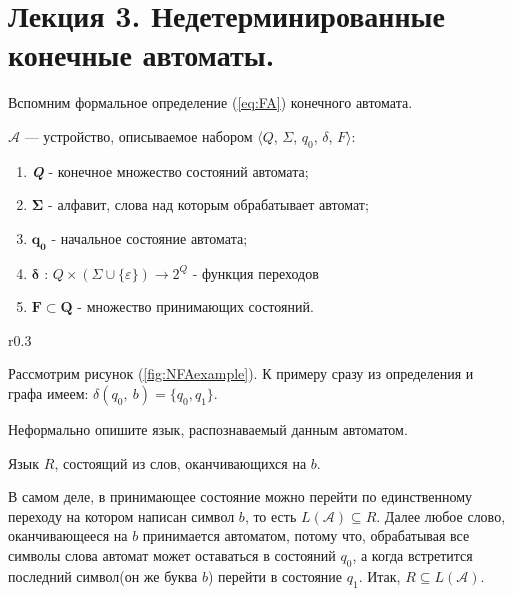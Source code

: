 \section{Лекция 3. Недетерминированные конечные автоматы.}

Вспомним формальное определение (\ref{eq:FA}) конечного автомата.

\textbf{} $\mathcal{A}$ --- устройство, описываемое набором $\langle Q$, $\Sigma$, $q_0$, $\delta$, $F \rangle$:
\begin{enumerate}
  \item {\bfseries\itshape{Q}} - конечное множество состояний автомата;
  \item $\boldsymbol{\Sigma}$ - алфавит, слова над которым обрабатывает автомат;
  \item $\boldsymbol{q_0}$ - начальное состояние автомата;
  \item $\boldsymbol{\delta}$ : $Q \times (\Sigma\cup\{\varepsilon\} ) \rightarrow 2^{Q}$ - функция переходов
  \item $\boldsymbol{F} \subset \boldsymbol{Q}$ - множество принимающих состояний.
\end{enumerate}


\begin{wrapfigure}{r}{0.3\textwidth}
  \centering
  \caption{Пример НДА.}
  \label{fig:NFAexample}
\end{wrapfigure}

Рассмотрим рисунок (\ref{fig:NFAexample}). К примеру сразу из определения и графа имеем: $\delta(q_0,\:b)=\{q_0,q_1\}$.

\begin{question}
  Неформально опишите язык, распознаваемый данным автоматом.
\end{question}

\begin{nonum}
  Язык $R$, состоящий из слов, оканчивающихся на $b$.

  В самом деле, в принимающее состояние можно перейти по единственному переходу на котором написан символ $b$, то есть $L(\mathcal{A})\subseteq R$.
  Далее любое слово, оканчивающееся на $b$ принимается автоматом, потому что, обрабатывая все символы слова автомат может оставаться в состояний
  $q_0$, а когда встретится последний символ(он же буква $b$) перейти в состояние $q_1$. Итак, $R\subseteq L(\mathcal{A})$.
\end{nonum}

